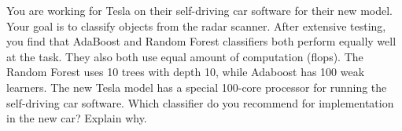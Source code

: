 You are working for Tesla on their self-driving car software for their new model. Your goal is to classify objects from the radar scanner. After extensive testing, you find that AdaBoost and Random Forest classifiers both perform equally well at the task. They also both use equal amount of computation (flops). The Random Forest uses 10 trees with depth 10, while Adaboost has 100 weak learners. The new Tesla model has a special 100-core processor for running the self-driving car software. Which classifier do you recommend for implementation in the new car? Explain why.
